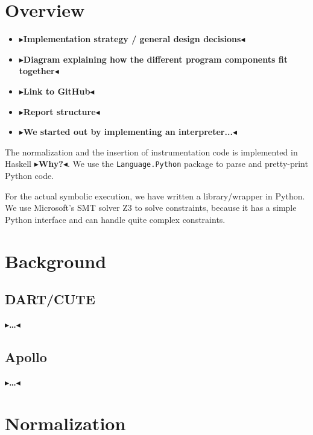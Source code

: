 \documentclass[11pt]{report}
\newcommand{\todo}[1]{{\color[rgb]{.5,0,0}\textbf{$\blacktriangleright$#1$\blacktriangleleft$}}}
\begin{document}

\chapter{Overview}
\label{ch:overview}

\begin{itemize}
  \item \todo{Implementation strategy / general design decisions}
  \item \todo{Diagram explaining how the different program components
    fit together}
  \item \todo{Link to GitHub}
  \item \todo{Report structure}
  \item \todo{We started out by implementing an interpreter...}
\end{itemize}

The normalization and the insertion of instrumentation code is
implemented in Haskell \todo{Why?}. We use the \verb|Language.Python|
package to parse and pretty-print Python code.

For the actual symbolic execution, we have written a library/wrapper
in Python. We use Microsoft's SMT solver Z3 to solve constraints,
because it has a simple Python interface and can handle quite complex
constraints.





\chapter{Background}
\label{ch:background}

\section{DART/CUTE}
\todo{\dots}

\section{Apollo}
\todo{\dots}


\chapter{Normalization}
\label{ch:norm}
\end{document}
